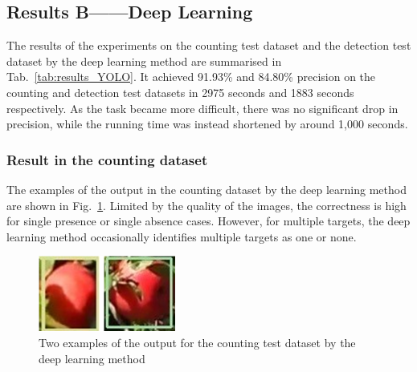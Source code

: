 \subsection{Results B——Deep Learning}
The results of the experiments on the counting test dataset and the detection test dataset by the deep learning method are summarised in Tab.~\ref{tab:results_YOLO}. It achieved 91.93\% and 84.80\% precision on the counting and detection test datasets in 2975 seconds and 1883 seconds respectively. As the task became more difficult, there was no significant drop in precision, while the running time was instead shortened by around 1,000 seconds.

\begin{table}[htb]
\centering
\caption{Results of the deep learning method}
\label{tab:results_YOLO}
\end{table}

\subsubsection{Result in the counting dataset}
The examples of the output in the counting dataset by the deep learning method are shown in Fig.~\ref{fig:result_count_YOLO}. Limited by the quality of the images, the correctness is high for single presence or single absence cases. However, for multiple targets, the deep learning method occasionally identifies multiple targets as one or none.

\begin{figure}[htb]
    \centering
    \includegraphics[width=0.4\textwidth]{images/result_YOLO_count.png}
    \caption{Two examples of the output for the counting test dataset by the deep learning method}
    \label{fig:result_count_YOLO}
\end{figure}

